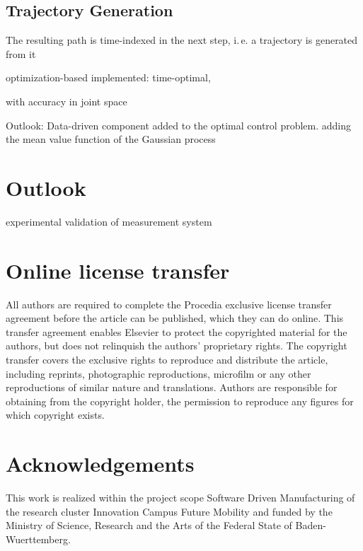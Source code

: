 \documentclass[5p,times,procedia]{elsarticle}
\begin{document}
\subsection{Trajectory Generation}
The resulting path is time-indexed in the next step, i.\,e. a trajectory is generated from it

optimization-based
implemented: time-optimal, 

with accuracy in joint space

Outlook: Data-driven component added to the optimal control problem.
adding the mean value function of the Gaussian process

\section{Outlook}
experimental validation of measurement system


\section{Online license transfer}
All authors are required to complete the Procedia exclusive license transfer agreement before the article can be published, which they can do online. This transfer agreement enables Elsevier to protect the copyrighted material for the authors, but does not relinquish the authors' proprietary rights. The copyright transfer covers the exclusive rights to reproduce and distribute the article, including reprints, photographic reproductions, microfilm or any other reproductions of similar nature and translations. Authors are responsible for obtaining from the copyright holder, the permission to reproduce any figures for which copyright exists.

\vfill\pagebreak

\section*{Acknowledgements}


 This work is realized within the project scope Software Driven Manufacturing of the research cluster Innovation Campus Future Mobility and funded by the Ministry of Science, Research and the Arts of the Federal State of Baden-Wuerttemberg.




\end{document}
